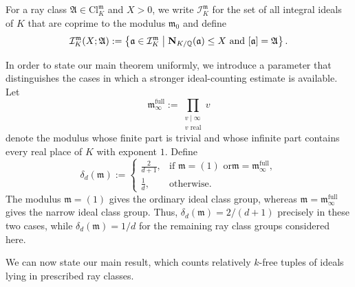 \documentclass[11pt, reqno]{amsart}
\numberwithin{equation}{section}
\newcommand{\suchthat}{\;\ifnum\currentgrouptype=16 \middle\fi|\;}
\newcommand{\Q}{\mathbb{Q}}
\newcommand{\Nrm}[2]{\mathbf{N}_{#1}(#2)}
\theoremstyle{definition}
\begin{document}
For a ray class $\mathfrak{A}\in\mathrm{Cl}_K^{\mathfrak{m}}$ and
$X>0$, we write $\mathcal{I}_K^{\mathfrak{m}}$ for the set of all integral ideals of $K$ that are coprime to the modulus $\mathfrak{m}_0$ and define
\begin{equation}\label{eqn:ideals-in-ray-class-bounded-norm}
\mathcal{I}_K^{\mathfrak{m}}(X;\mathfrak{A})
:=
\left\{
\mathfrak{a}\in\mathcal{I}_K^{\mathfrak{m}}
\suchthat
\Nrm{K/\Q}{\mathfrak{a}}\leq X
\text{ and }
[\mathfrak{a}]=\mathfrak{A}
\right\}.
\end{equation}

In order to state our main theorem uniformly, we introduce a parameter
that distinguishes the cases in which a stronger ideal-counting
estimate is available. Let
\[
\mathfrak{m}_{\infty}^{\mathrm{full}}
:=
\prod_{\substack{v\mid\infty\\ v\text{ real}}} v
\]
denote the modulus whose finite part is trivial and whose infinite
part contains every real place of $K$ with exponent $1$. Define
\begin{equation}\label{eqn:delta-d-m}
\delta_d(\mathfrak{m})
:=
\begin{cases}
\displaystyle \frac{2}{d+1},
&
\text{if $\mathfrak{m}=(1)$ or
$\mathfrak{m}=\mathfrak{m}_{\infty}^{\mathrm{full}}$},
\\[8pt]
\displaystyle \frac{1}{d},
&
\text{otherwise}.
\end{cases}
\end{equation}
The modulus $\mathfrak{m}=(1)$ gives the ordinary ideal class group,
whereas $\mathfrak{m}=\mathfrak{m}_{\infty}^{\mathrm{full}}$ gives the narrow ideal
class group. Thus, $\delta_d(\mathfrak{m})=2/(d+1)$ precisely in
these two cases, while $\delta_d(\mathfrak{m})=1/d$ for the remaining
ray class groups considered here.

We can now state our main result, which counts relatively $k$-free
tuples of ideals lying in prescribed ray classes.
\end{document}
